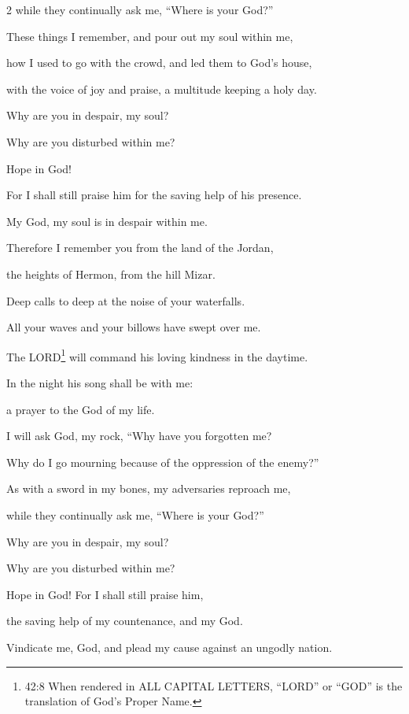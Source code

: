 \begin{multicols}{2}
	while they continually ask me, “Where is your God?”
	
	
	\myverse{}These things I remember, and pour out my soul within me,
	
	how I used to go with the crowd, and led them to God’s house,
	
	with the voice of joy and praise, a multitude keeping a holy day.
	
	
	\myverse{}Why are you in despair, my soul?
	
	Why are you disturbed within me?
	
	Hope in God!
	
	For I shall still praise him for the saving help of his presence.
	
	
	\myverse{}My God, my soul is in despair within me.
	
	Therefore I remember you from the land of the Jordan,
	
	the heights of Hermon, from the hill Mizar.
	
	
	\myverse{}Deep calls to deep at the noise of your waterfalls.
	
	All your waves and your billows have swept over me.
	
	\vspace{\baselineskip}
	
	\myverse{}The LORD\footnote{42:8 When rendered in ALL CAPITAL LETTERS, “LORD” or “GOD” is the translation of God’s Proper Name.}
	will command his loving kindness in the daytime.
	
	In the night his song shall be with me:
	
	a prayer to the God of my life.
	
	
	\myverse{}I will ask God, my rock, “Why have you forgotten me?
	
	Why do I go mourning because of the oppression of the enemy?”
	
	
	\myverse{}As with a sword in my bones, my adversaries reproach me,
	
	while they continually ask me, “Where is your God?”
	
	
	\myverse{}Why are you in despair, my soul?
	
	Why are you disturbed within me?
	
	Hope in God! For I shall still praise him,
	
	the saving help of my countenance, and my God.
	
	
	\mychapter{}\myverse*{}Vindicate me, God, and plead my cause against an ungodly nation.
	

\end{multicols}

